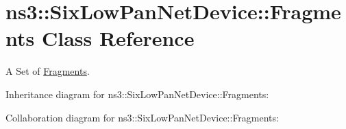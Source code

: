 \hypertarget{classns3_1_1SixLowPanNetDevice_1_1Fragments}{}\section{ns3\+:\+:Six\+Low\+Pan\+Net\+Device\+:\+:Fragments Class Reference}
\label{classns3_1_1SixLowPanNetDevice_1_1Fragments}


A Set of \hyperlink{classns3_1_1SixLowPanNetDevice_1_1Fragments}{Fragments}.  




Inheritance diagram for ns3\+:\+:Six\+Low\+Pan\+Net\+Device\+:\+:Fragments\+:


Collaboration diagram for ns3\+:\+:Six\+Low\+Pan\+Net\+Device\+:\+:Fragments\+:
